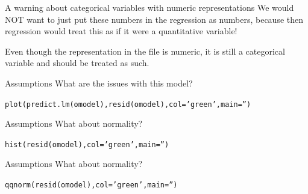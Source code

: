 \documentclass{beamer}\usepackage[]{graphicx}\usepackage[]{color}
\makeatletter
\newcommand{\hlstr}[1]{\textcolor[rgb]{1,0.894,0.71}{#1}}%
\newcommand{\hlstd}[1]{\textcolor[rgb]{1,0.894,0.769}{#1}}%
\newcommand{\hlkwc}[1]{\textcolor[rgb]{0.78,0.941,0.545}{#1}}%
\newcommand{\hlkwd}[1]{\textcolor[rgb]{1,0.78,0.769}{#1}}%
\newenvironment{kframe}{%
 \def\at@end@of@kframe{}%
 \ifinner\ifhmode%
  \def\at@end@of@kframe{\end{minipage}}%
  \begin{minipage}{\columnwidth}%
 \fi\fi%
 \def\FrameCommand##1{\hskip\@totalleftmargin \hskip-\fboxsep
 \colorbox{shadecolor}{##1}\hskip-\fboxsep
     \hskip-\linewidth \hskip-\@totalleftmargin \hskip\columnwidth}%
 \MakeFramed {\advance\hsize-\width
   \@totalleftmargin\z@ \linewidth\hsize
   \@setminipage}}%
 {\par\unskip\endMakeFramed%
 \at@end@of@kframe}
\newenvironment{knitrout}{}{} %
\makeatother
\begin{document}
\begin{darkframes}
\begin{frame}[fragile]{A warning about categorical variables with numeric representations}
          We would NOT want to just put these numbers in the regression as numbers, because then regression would treat this as if it were a quantitative variable!
          \bigskip  \pause

          Even though the representation in the file is numeric, it is still a categorical variable and should be treated as such.

\end{frame}



\begin{frame}[fragile]{Assumptions}
        \fontsize{9}{9}\selectfont
        What are the issues with this model?
        \lc
\begin{knitrout}
\begin{kframe}
\begin{alltt}
\hlkwd{plot}\hlstd{(}\hlkwd{predict.lm}\hlstd{(omodel),} \hlkwd{resid}\hlstd{(omodel),} \hlkwc{col}\hlstd{=}\hlstr{'green'}\hlstd{,} \hlkwc{main}\hlstd{=}\hlstr{''}\hlstd{)}
\end{alltt}
\end{kframe}


\end{knitrout}

\end{frame}



\begin{frame}[fragile]{Assumptions}
      \fontsize{9}{9}\selectfont
        What about normality?
\begin{knitrout}
\begin{kframe}
\begin{alltt}
  \hlkwd{hist}\hlstd{(}\hlkwd{resid}\hlstd{(omodel),} \hlkwc{col}\hlstd{=}\hlstr{'green'}\hlstd{,} \hlkwc{main}\hlstd{=}\hlstr{''}\hlstd{)}
\end{alltt}
\end{kframe}


\end{knitrout}

\end{frame}


\begin{frame}[fragile]{Assumptions}
        \fontsize{9}{9}\selectfont
        What about normality?

\begin{knitrout}
\begin{kframe}
\begin{alltt}
  \hlkwd{qqnorm}\hlstd{(}\hlkwd{resid}\hlstd{(omodel),} \hlkwc{col}\hlstd{=}\hlstr{'green'}\hlstd{,} \hlkwc{main}\hlstd{=}\hlstr{''}\hlstd{)}
\end{alltt}
\end{kframe}



\end{knitrout}
\end{frame}
\end{darkframes}
\end{document}
